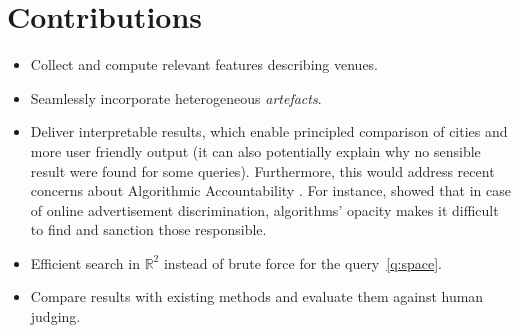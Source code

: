 \section{Contributions}

\begin{itemize}
	\item Collect and compute relevant features describing venues.
	\item Seamlessly incorporate heterogeneous \emph{artefacts}.
	\item Deliver interpretable results, which enable principled comparison
		of cities and more user friendly output (it can also potentially
		explain why no sensible result were found for some queries).
		Furthermore, this would address recent concerns about
		Algorithmic Accountability \autocite{Accountability13}. For instance,
		\textcite{Discrimination13} showed that in case of online advertisement
		discrimination, algorithms' opacity makes it difficult to find and
		sanction those responsible.
	\item Efficient search in $\mathbb{R}^2$ instead of brute force for
		the query~\ref{q:space}.
	\item Compare results with existing methods and evaluate them against
		human judging.
\end{itemize}

